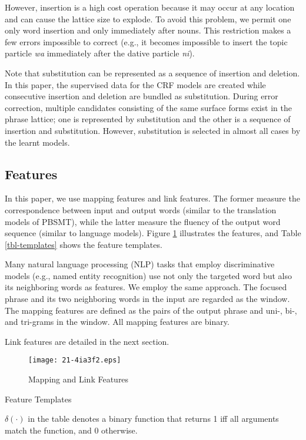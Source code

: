 \documentclass[english]{jnlp_1.4_rep}
\begin{document}
However, insertion is a high cost operation because it may occur at
any location and can cause the lattice size to explode. To avoid this
problem, we permit one only word insertion and only immediately after
nouns. This restriction makes a few errors impossible to correct
(e.g., it becomes impossible to insert the topic particle \textit{wa}
immediately after the dative particle \textit{ni}).


Note that substitution can be represented as a sequence of insertion
and deletion. In this paper, the supervised data for the CRF models
are created while consecutive insertion and deletion are bundled as
substitution. During error correction, multiple candidates consisting
of the same surface forms exist in the phrase lattice; one is
represented by substitution and the other is a sequence of insertion
and substitution. However, substitution is selected in almost all
cases by the learnt models.


\subsection{Features}

In this paper, we use mapping features and link features. The former
measure the correspondence between input and output words (similar to
the translation models of PBSMT), while the latter measure the fluency
of the output word sequence (similar to language models). Figure
\ref{fig-features} illustrates the features, and Table
\ref{tbl-templates} shows the feature templates.

Many natural language processing (NLP) tasks that employ
discriminative models (e.g., named entity recognition) use not only
the targeted word but also its neighboring words as features. We
employ the same approach. The focused phrase and its two neighboring
words in the input are regarded as the window. The mapping features
are defined as the pairs of the output phrase and uni-, bi-, and
tri-grams in the window. All mapping features are binary.

Link features are detailed in the next section.

\begin{figure}[t]
\begin{center}
\texttt{[image: 21-4ia3f2.eps]}
\caption{Mapping and Link Features}
\label{fig-features}
\end{center}
\end{figure}

\begin{table}[t]
\caption{Feature Templates}
\label{tbl-templates}

\vspace{4pt}\small
$\delta(\cdot)$ in the table denotes a binary function that returns 1 
iff all arguments match the function, and 0 otherwise.
\par
\end{table}
\end{document}
